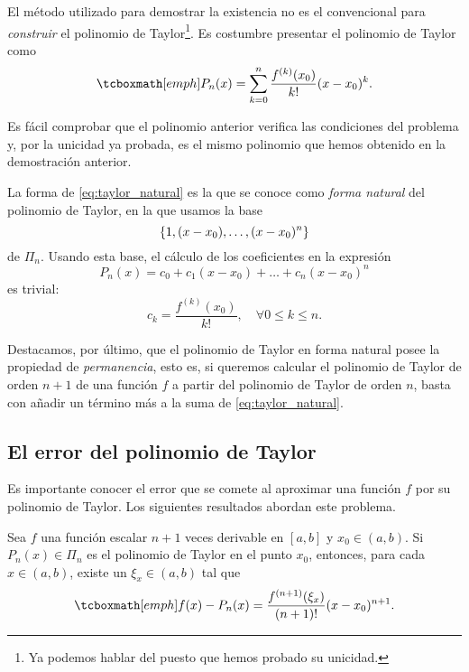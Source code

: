   El método utilizado para demostrar la existencia no es el convencional
  para \textit{construir} el polinomio de Taylor\footnote{Ya podemos hablar
  del  puesto que hemos probado su
  unicidad.}. Es costumbre presentar el polinomio de Taylor como
  \begin{equation} \label{eq:taylor_natural}
    \emphmath{
      P_n(x) = \sum_{k=0}^n \frac{f^{(k)}(x_0)}{k!} (x - x_0)^k.
    }
  \end{equation}

  Es fácil comprobar que el polinomio anterior verifica las condiciones del
  problema y, por la unicidad ya probada, es el mismo polinomio que hemos
  obtenido en la demostración anterior.

  La forma de \ref{eq:taylor_natural} es la que se conoce como
  \textit{forma natural} del polinomio de Taylor, en la que usamos la base
  \[
    \left\lbrace1, (x - x_0), \dots, (x - x_0)^n\right\rbrace
  \]
  de $\Pi_n$. Usando esta base, el cálculo de los coeficientes en la
  expresión
  \[
    P_n(x) = c_0 + c_1 (x - x_0) + \dots + c_n (x - x_0)^n
  \]
  es trivial:
  \[
    c_k = \frac{f^{(k)}(x_0)}{k!}, \quad \forall 0 \le k \le n.
  \]
  
  Destacamos, por último, que el polinomio de Taylor en forma natural posee
  la propiedad de \textit{permanencia}, esto es, si queremos calcular el
  polinomio de Taylor de orden $n + 1$ de una función $f$ a partir del
  polinomio de Taylor de orden $n$, basta con añadir un término más a la
  suma de \ref{eq:taylor_natural}.

  \subsection{El error del polinomio de Taylor}
    Es importante conocer el error que se comete al aproximar una función
    $f$ por su polinomio de Taylor. Los siguientes resultados abordan este
    problema.

    \begin{theorem}
      \label{thm:error_taylor}
      Sea $f$ una función escalar $n + 1$ veces derivable en $[a, b]$ y
      $x_0 \in (a, b)$. Si $P_n(x) \in \Pi_n$ es el polinomio de Taylor en
      el punto $x_0$, entonces, para cada $x \in (a, b)$, existe un $\xi_x
      \in (a, b)$ tal que
      \begin{equation} \label{eq:error_lagrange}
        \emphmath{
          f(x) - P_n(x) = \frac{f^{(n+1)}(\xi_x)}{(n+1)!}(x - x_0)^{n+1}.
        }
      \end{equation}
    \end{theorem}


